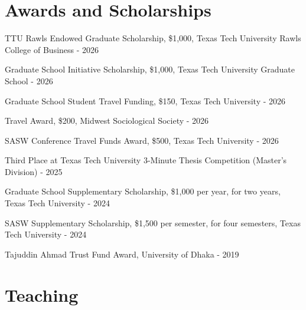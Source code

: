 \documentclass[letterpaper,10pt]{article}
\begin{document}
    \section{Awards and Scholarships}
    \begin{description}[font=$\bullet$]
        \item{TTU Rawls Endowed Graduate Scholarship, \$1,000, Texas Tech University Rawls College of Business - 2026}
        \item{Graduate School Initiative Scholarship, \$1,000, Texas Tech University Graduate School - 2026}
        \item{Graduate School Student Travel Funding, \$150, Texas Tech University - 2026}
        \item{Travel Award, \$200, Midwest Sociological Society - 2026}
        \item{SASW Conference Travel Funds Award, \$500, Texas Tech University - 2026}
        \item{Third Place at Texas Tech University 3-Minute Thesis Competition (Master’s Division) - 2025}
        \item{Graduate School Supplementary Scholarship, \$1,000 per year, for two years, Texas Tech University - 2024}
        \item{SASW Supplementary Scholarship, \$1,500 per semester, for four semesters, Texas Tech University - 2024}
        \item{Tajuddin Ahmad Trust Fund Award, University of Dhaka - 2019}
    \end{description}
    \vspace{0.65em}

    \section{Teaching}
\end{document}
